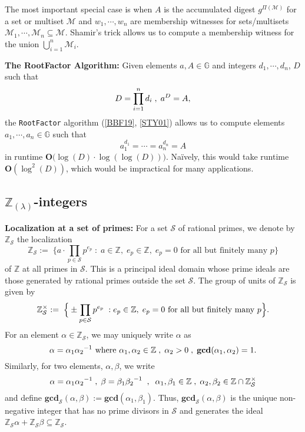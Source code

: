 \documentclass[11pt, lettersize, notitlepage, leqno, footskip=0.6cm]{article}
\newcommand{\bz}{\mathbb Z}
\newcommand{\pl}{\prod\limits}
\newcommand{\slim}{\sum\limits}
\newcommand{\bG}{\mathbb{G}}
\newcommand{\mc}{\mathcal}
\newcommand{\mb}{\mathbb}
\newcommand{\mbf}{\mathbf}
\newcommand{\al}{\alpha}
\newcommand{\be}{\beta}
\newcommand{\lamb}{\lambda}
\newcommand{\bzs}{\bz_{\mc{S}}}
\newcommand{\sub}{\subseteq}
\newcommand{\vs}{\vspace{-0.15cm}}
\newcommand{\noin}{\noindent}
\newcommand{\op}{overwhelming probability}
\newcommand{\LCM}{\mbf{lcm}}
\newcommand{\GCD}{\mbf{gcd}}
\numberwithin{equation}{section}
\begin{document}
The most important special case is when $A$ is the accumulated digest $g^{\Pi(\mc{M})}$ for a set or multiset $\mc{M}$ and $w_1,\cdots,w_n$ are membership witnesses for sets/multisets $\mc{M}_1,\cdots,\mc{M}_n\sub \mc{M}$. Shamir's trick allows us to compute a membership witness for the union $\bigcup_{i=1}^n \mc{M}_i$. 

\begin{comment} Conversely, for any element $b = \pl_{i=1}^n a_i^{x_i}$ $(x_i\in\bz)$, we have \vs $$ b^{\LCM(d_1,\cdots,d_n)} = A^{\slim_{i=1}^n  \frac{\LCM(d_1,\cdots,d_n)x_i}{d_i}} $$ and the low order assumption implies that with \op, \vs $$b =  a^{\slim_{i=1}^n  \frac{\LCM(d_1,\cdots,d_n)x_i}{d_i}}.$$ Thus, $b$ is expressible as a power of $a$. 

\end{comment}

\vspace{0.2cm}


\noin \textbf{The RootFactor Algorithm:} Given elements $a, A\in\mb{G}$ and integers $d_1,\cdots, d_n$, $D$ such that \vs $$D= \pl_{i=1}^n d_i\; ,\; a^{D} = A,\vs $$ the {\tt{RootFactor}} algorithm (\hyperlink{BBF19}{[BBF19]}, \hyperlink{STY01}{[STY01]}) allows us to compute elements $a_1,\cdots, a_n\in \bG$ such that \vs $$a_1^{d_1}=\cdots = a_n^{d_n} = A$$ in runtime $\mbf{O}\big(\log(D)\cdot \log(\log(D))\big)$. Na\"ively, this would take runtime $\mbf{O}(\log^2(D))$, which would be impractical for many applications.


\subsection{\fontsize{11}{11}\selectfont $\bz_{(\lamb)}$-integers}


\noin \textbf{Localization at a set of primes:} For a set $\mc{S}$ of rational primes, we denote by $\bz_{\mc{S}}$ the localization \vs $$\bz_{\mc{S}}:= \;\Big\{a\cdot\pl_{p\in \mc{S}} p^{e_p}\;:\;a\in\bz,\; e_p\in \bz,\;e_p = 0 \text{ for all but finitely many } p\Big\} $$ of $\bz$ at all primes in $\mc{S}$. This is a principal ideal domain whose prime ideals are those generated by rational primes outside the set $\mc{S}$. The group of units of $\bzs$ is given by \vs $$\bzs^{\times}:= \;\Big\{\pm {\pl_{p\in \mc{S}} p^{e_p}}\;: e_p\in \bz,\;e_p = 0 \text{ for all but finitely many } p\Big\} . \vs $$ For an element $\al\in \bz_{\mc{S}}$, we may uniquely write $\al$ as \vs $$\al = {\al_1}{\al_2}^{-1} \text{ where } \al_1,\al_2\in \bz\;,\; \al_2>0\;,\;\GCD(\al_1,\al_2) = 1.\vs $$ Similarly, for two elements, $\al,\be$, we write \vs $$\al = \al_1{\al_2}^{-1}\;,\; \be = {\be_1}{\be_2}^{-1}\;\;,\;\;\al_1,\be_1\in\bz\;,\;\al_2,\be_2\in \bz\cap\bzs^{\times} \vs $$ and define $\GCD_{\mc{S}}(\al,\be):= \GCD(\al_1,\be_1)$. Thus, $\GCD_{\mc{S}}(\al,\be)$ is the unique non-negative integer that has no prime divisors in $\mc{S}$ and generates the ideal $\bzs \al+\bzs\be\sub \bzs$.\vspace{0.15cm}
\end{document}
